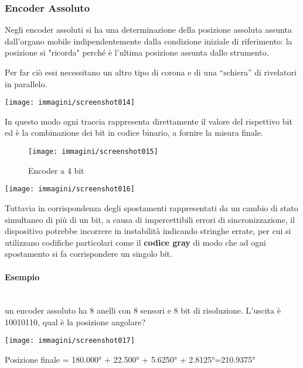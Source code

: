 \documentclass[a4paper, 15pt]{article}
\begin{document}
\subsubsection{Encoder Assoluto}
\begin{adjustwidth}{2in}{}
	Negli encoder assoluti si ha una determinazione della posizione assoluta assunta dall'organo mobile indipendentemente dalla condizione iniziale di riferimento: la posizione si "ricorda" perché è l'ultima posizione assunta dallo strumento. \newline
	
	 Per far ciò essi necessitano un altro tipo di corona e di una “schiera” di rivelatori in parallelo.
	 \begin{center}
	 	\texttt{[image: immagini/screenshot014]}
	 \end{center}
	 In questo modo ogni traccia rappresenta direttamente il valore del rispettivo bit ed è la combinazione dei bit in codice binario, a fornire la misura finale.
	 \begin{figure}[H]
	 	\centering
	 	\texttt{[image: immagini/screenshot015]}
	 	\caption{Encoder a 4 bit}
	 	\label{fig:screenshot015}
	 \end{figure}
	 \begin{center}
	 	\texttt{[image: immagini/screenshot016]}
	 \end{center}
	 Tuttavia in corrispondenza degli spostamenti rappresentati da un cambio di stato simultaneo di più di un bit, a causa di impercettibili errori di sincronizzazione, il dispositivo potrebbe incorrere in instabilità indicando stringhe errate, per cui si utilizzano codifiche particolari come il \textbf{codice gray} di modo che ad ogni spostamento si fa corrispondere un singolo bit. 
\paragraph{Esempio} \mbox{} \\ 
un encoder assoluto ha 8 anelli con 8 sensori e 8
bit di risoluzione. L’uscita è 10010110, qual è la posizione angolare?
\begin{center}
	\texttt{[image: immagini/screenshot017]}
\end{center}
Posizione finale = \ang{180.000} + \ang{22.500} + \ang{5.6250} + \ang{2.8125}=\ang{210.9375}
\end{adjustwidth}
\newpage
\end{document}
